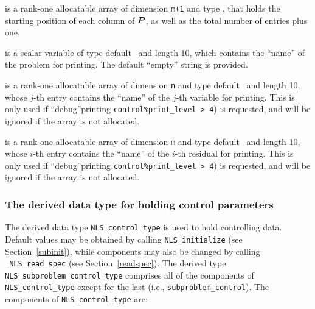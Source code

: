 \documentclass{galahad}
\newcommand{\packagename}{NLS}
\newcommand{\fullpackagename}{\libraryname\_\packagename}
\begin{document}
\begin{description}
\begin{description}
 is a rank-one allocatable array of dimension {\tt m+1}
and type \integer, that holds the starting position of
each column of ${\bm{P}}$, as well as the total number of entries plus one.

\end{description}

 is a scalar variable of type
default \character\ and length 10, which contains the
``name'' of the problem for printing. The default ``empty'' string is
provided.

 is a rank-one allocatable array of dimension {\tt n} and type
default \character\ and length 10, whose $j$-th entry contains the
``name'' of the $j$-th variable for printing. This is only used
if ``debug''printing {\tt control\%print\_level > 4}) is requested,
and will be ignored if the array is not allocated.

 is a rank-one allocatable array of dimension {\tt m} and type
default \character\ and length 10, whose $i$-th entry contains the
``name'' of the $i$-th residual for printing. This is only used
if ``debug''printing {\tt control\%print\_level > 4}) is requested,
and will be ignored if the array is not allocated.

\end{description}


\subsubsection{The derived data type for holding control
 parameters}\label{typecontrol}
The derived data type
{\tt \packagename\_control\_type}
is used to hold controlling data. Default values may be obtained by calling
{\tt \packagename\_initialize}
(see Section~\ref{subinit}),
while components may also be changed by calling
{\tt \fullpackagename\_read\-\_spec}
(see Section~\ref{readspec}).
The derived type {\tt \packagename\_subproblem\_control\_type}
comprises all of the components of {\tt \packagename\_control\_type}
except for the last (i.e., {\tt subproblem\_control}).
The components of
{\tt \packagename\_control\_type}
are:
\end{document}
